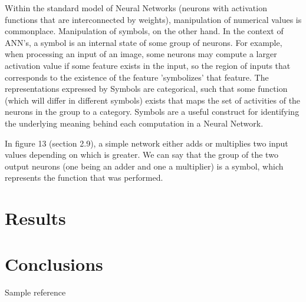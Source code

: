 \documentclass{article}
\begin{document}
		Within the standard model of Neural Networks (neurons with activation functions that are interconnected by weights), manipulation of numerical values is commonplace. Manipulation of symbols, on the other hand. In the context of ANN's, a symbol is an internal state of some group of neurons. For example, when processing an input of an image, some neurons may compute a larger activation value if some feature exists in the input, so the region of inputs that corresponds to the existence of the feature 'symbolizes' that feature. The representations expressed by Symbols are categorical, such that some function (which will differ in different symbols) exists that maps the set of activities of the neurons in the group to a category. Symbols are a useful construct for identifying the underlying meaning behind each computation in a Neural Network.
		
		In figure 13 (section 2.9), a simple network either adds or multiplies two input values depending on which is greater. We can say that the group of the two output neurons (one being an adder and one a multiplier) is a symbol, which represents the function that was performed.
	
	\section{Results}
	
	\section{Conclusions}
	
	\begin{thebibliography}{9}
		Sample reference 
	\end{thebibliography}
\end{document}
